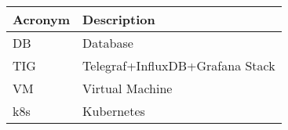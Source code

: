 \addtocounter{table}{-1}
\begin{longtable}{p{}p{}}\hline
\textbf{Acronym} & \textbf{Description}  \\\hline

DB & Database \\\hline
TIG & Telegraf+InfluxDB+Grafana Stack \\\hline
VM & Virtual Machine \\\hline
k8s & Kubernetes \\\hline
\end{longtable}
